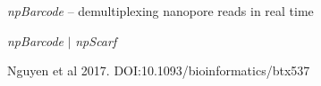 \documentclass{beamer}
\begin{document}
\begin{frame}{\emph{npBarcode} -- demultiplexing nanopore reads in real time}
\begin{center}
\end{center}
\end{frame}

\begin{frame}{\emph{npBarcode} $\vert$ \emph{npScarf}}
\begin{figure}[!hpb]
\centering
{}%
\hfill
{}%
\hfill
{}%
\hfill
{}%
\end{figure}
\vspace*{-0.3cm}
Nguyen et al 2017.  DOI:10.1093/bioinformatics/btx537
\end{frame}
\end{document}
